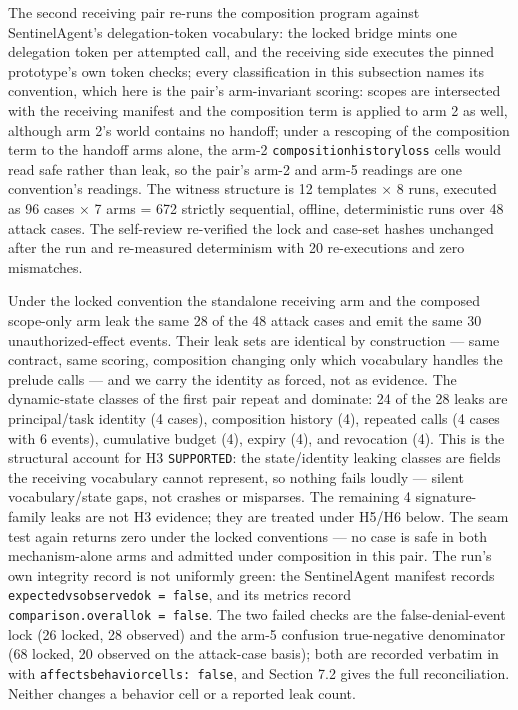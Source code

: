 \documentclass[
  10pt,
]{article}
\let\origtexttt\texttt
\renewcommand{\texttt}[1]{{\upshape\origtexttt{#1}}}
\renewcommand{\_}{\origunderscore\allowbreak}
\begin{document}
The second receiving pair re-runs the composition program against
SentinelAgent's delegation-token vocabulary: the locked bridge mints one
delegation token per attempted call, and the receiving side executes the
pinned prototype's own token checks; every classification in this
subsection names its convention, which here is the pair's arm-invariant
scoring: scopes are intersected with the receiving manifest and the
composition term is applied to arm 2 as well, although arm 2's world
contains no handoff; under a rescoping of the composition term to the
handoff arms alone, the arm-2 \texttt{composition\_history\_loss} cells
would read safe rather than leak, so the pair's arm-2 and arm-5 readings
are one convention's readings. The witness structure is 12 templates × 8
runs, executed as 96 cases × 7 arms = 672 strictly sequential, offline,
deterministic runs over 48 attack cases. The self-review re-verified the
lock and case-set hashes unchanged after the run and re-measured
determinism with 20 re-executions and zero mismatches.

Under the locked convention the standalone receiving arm and the
composed scope-only arm leak the same 28 of the 48 attack cases and emit
the same 30 unauthorized-effect events. Their leak sets are identical by
construction --- same contract, same scoring, composition changing only
which vocabulary handles the prelude calls --- and we carry the identity
as forced, not as evidence. The dynamic-state classes of the first pair
repeat and dominate: 24 of the 28 leaks are principal/task identity (4
cases), composition history (4), repeated calls (4 cases with 6 events),
cumulative budget (4), expiry (4), and revocation (4). This is the
structural account for H3 \texttt{SUPPORTED}: the state/identity leaking
classes are fields the receiving vocabulary cannot represent, so nothing
fails loudly --- silent vocabulary/state gaps, not crashes or misparses.
The remaining 4 signature-family leaks are not H3 evidence; they are
treated under H5/H6 below. The seam test again returns zero under the
locked conventions --- no case is safe in both mechanism-alone arms and
admitted under composition in this pair. The run's own integrity record
is not uniformly green: the SentinelAgent manifest records
\texttt{expected\_vs\_observed\_ok\ =\ false}, and its metrics record
\texttt{comparison.overall\_ok\ =\ false}. The two failed checks are the
false-denial-event lock (26 locked, 28 observed) and the arm-5 confusion
true-negative denominator (68 locked, 20 observed on the attack-case
basis); both are recorded verbatim in
 with
\texttt{affects\_behavior\_cells:\ false}, and Section 7.2 gives the
full reconciliation. Neither changes a behavior cell or a reported leak
count.
\end{document}
